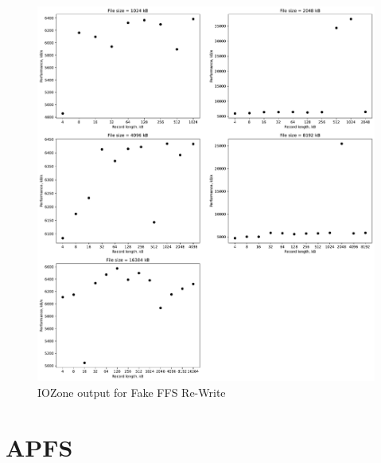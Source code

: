 \begin{figure}[!htb]
	\label{fig:app_bench_fffs_rnd_read}
	\begin{center}
		\includegraphics[width=1.0\textwidth]{figures/benchmarking/fake-ffs/Re-Write.pdf}
	\end{center}
	\caption{IOZone output for Fake FFS Re-Write}
\end{figure}

\section{APFS}








